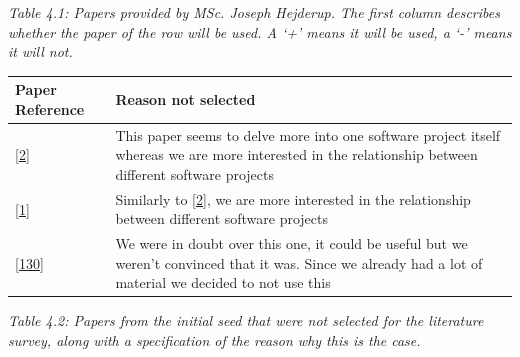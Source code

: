 \documentclass[]{book}
\begin{document}
\emph{Table 4.1: Papers provided by MSc. Joseph Hejderup. The first
column describes whether the paper of the row will be used. A `+' means
it will be used, a `-' means it will not.}

\begin{longtable}[]{@{}ll@{}}
\toprule
\begin{minipage}[b]{0.05\columnwidth}\raggedright\strut
Paper Reference\strut
\end{minipage} & \begin{minipage}[b]{0.05\columnwidth}\raggedright\strut
Reason not selected\strut
\end{minipage}\tabularnewline
\midrule
\endhead
\begin{minipage}[t]{0.05\columnwidth}\raggedright\strut
{[}\protect\hyperlink{ref-Abate2009}{2}{]}\strut
\end{minipage} & \begin{minipage}[t]{0.05\columnwidth}\raggedright\strut
This paper seems to delve more into one software project itself whereas
we are more interested in the relationship between different software
projects\strut
\end{minipage}\tabularnewline
\begin{minipage}[t]{0.05\columnwidth}\raggedright\strut
{[}\protect\hyperlink{ref-Abate2011}{1}{]}\strut
\end{minipage} & \begin{minipage}[t]{0.05\columnwidth}\raggedright\strut
Similarly to {[}\protect\hyperlink{ref-Abate2009}{2}{]}, we are more
interested in the relationship between different software projects\strut
\end{minipage}\tabularnewline
\begin{minipage}[t]{0.05\columnwidth}\raggedright\strut
{[}\protect\hyperlink{ref-Mens2013}{130}{]}\strut
\end{minipage} & \begin{minipage}[t]{0.05\columnwidth}\raggedright\strut
We were in doubt over this one, it could be useful but we weren't
convinced that it was. Since we already had a lot of material we decided
to not use this\strut
\end{minipage}\tabularnewline
\bottomrule
\end{longtable}

\emph{Table 4.2: Papers from the initial seed that were not selected for
the literature survey, along with a specification of the reason why this
is the case.}
\end{document}
